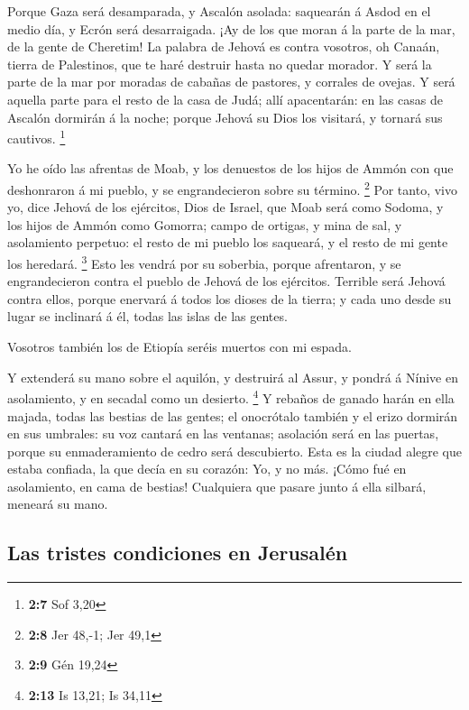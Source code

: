  Porque Gaza será desamparada, y Ascalón asolada: saquearán
á Asdod en el medio día, y Ecrón será desarraigada.  ¡Ay de
los que moran á la parte de la mar, de la gente de Cheretim! La palabra
de Jehová es contra vosotros, oh Canaán, tierra de Palestinos, que te
haré destruir hasta no quedar morador.  Y será la parte de
la mar por moradas de cabañas de pastores, y corrales de ovejas.
 Y será aquella parte para el resto de la casa de Judá; allí
apacentarán: en las casas de Ascalón dormirán á la noche; porque Jehová
su Dios los visitará, y tornará sus cautivos. \footnote{\textbf{2:7} Sof
  3,20}

 Yo he oído las afrentas de Moab, y los denuestos de los
hijos de Ammón con que deshonraron á mi pueblo, y se engrandecieron
sobre su término. \footnote{\textbf{2:8} Jer 48,-1; Jer 49,1}
 Por tanto, vivo yo, dice Jehová de los ejércitos, Dios de
Israel, que Moab será como Sodoma, y los hijos de Ammón como Gomorra;
campo de ortigas, y mina de sal, y asolamiento perpetuo: el resto de mi
pueblo los saqueará, y el resto de mi gente los heredará. \footnote{\textbf{2:9}
  Gén 19,24}  Esto les vendrá por su soberbia, porque
afrentaron, y se engrandecieron contra el pueblo de Jehová de los
ejércitos.  Terrible será Jehová contra ellos, porque
enervará á todos los dioses de la tierra; y cada uno desde su lugar se
inclinará á él, todas las islas de las gentes.

 Vosotros también los de Etiopía seréis muertos con mi
espada.

 Y extenderá su mano sobre el aquilón, y destruirá al
Assur, y pondrá á Nínive en asolamiento, y en secadal como un desierto.
\footnote{\textbf{2:13} Is 13,21; Is 34,11}  Y rebaños de
ganado harán en ella majada, todas las bestias de las gentes; el
onocrótalo también y el erizo dormirán en sus umbrales: su voz cantará
en las ventanas; asolación será en las puertas, porque su enmaderamiento
de cedro será descubierto.  Esta es la ciudad alegre que
estaba confiada, la que decía en su corazón: Yo, y no más. ¡Cómo fué en
asolamiento, en cama de bestias! Cualquiera que pasare junto á ella
silbará, meneará su mano.

\hypertarget{las-tristes-condiciones-en-jerusaluxe9n}{%
\subsection{Las tristes condiciones en
Jerusalén}\label{las-tristes-condiciones-en-jerusaluxe9n}}

